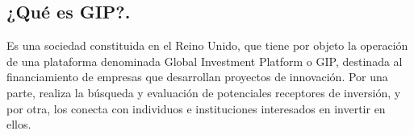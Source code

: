 \subsection{¿Qué es GIP?.}

Es una sociedad constituida en el Reino Unido, que tiene por objeto la operación de una plataforma denominada Global Investment Platform o GIP, destinada al financiamiento de empresas que desarrollan proyectos de innovación. Por una parte, realiza la búsqueda y evaluación de potenciales receptores de inversión, y por otra, los conecta con individuos e instituciones interesados en invertir en ellos.
